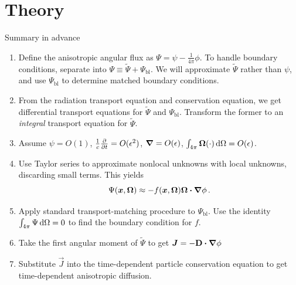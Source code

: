 \documentclass{beamer}
\begin{document}
\section{Theory}
\begin{frame}{Summary in advance}
\begin{enumerate}
  \item Define the anisotropic angular flux as $\Psi = \psi -
    \frac{1}{4\pi}\phi$. To handle boundary conditions, separate into $\Psi
    \equiv \tilde \Psi + \Psi_\mathrm{bl}$. We will approximate $\tilde \Psi$
    rather than $\psi$, and use $\Psi_\mathrm{bl}$ to determine matched boundary
    conditions.
  \item From the radiation transport equation and conservation equation, we get
    differential transport equations for $\tilde \Psi$ and $\Psi_\mathrm{bl}$.
    Transform the former to an \emph{integral} transport equation for $\tilde
    \Psi$.
  \item Assume $\psi=O(1)$, $\frac1c\frac{\partial }{\partial t}=O(\epsilon^2)$, $\bm{\nabla} =
    O(\epsilon)$, $\int_{4\pi} \bm{\Omega} (\cdot) \mathop{}\!\mathrm{d}\Omega = O(\epsilon)$.
  \item Use Taylor series to approximate nonlocal unknowns with local
    unknowns, discarding small terms. This yields
    \begin{equation*}
      \Psi(\bm{x}, \bm{\Omega})
      \approx - f(\bm{x}, \bm{\Omega})  \bm{\Omega} \bm{\cdot} \bm{\nabla} \phi\,.
    \end{equation*}
  \item Apply standard transport-matching procedure to $\Psi_\mathrm{bl}$. Use
    the identity $\int_{4\pi} \Psi \mathop{}\!\mathrm{d}\Omega=0$ to find the boundary condition
    for $f$.
  \item Take the first angular moment of $\tilde \Psi$ to get
    $\bm{J}=-\mathbf{D} \bm{\cdot} \bm{\nabla} \phi$
  \item Substitute $\vec{J}$ into the time-dependent particle
    conservation equation to get time-dependent anisotropic diffusion.
\end{enumerate}
\end{frame}
\end{document}
